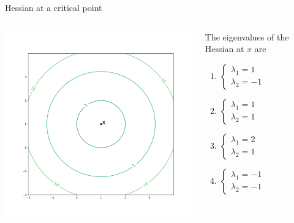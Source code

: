 \documentclass{beamer}
\begin{document}
\begin{frame}[t]{Hessian at a critical point}

	\vspace{-1.6cm}
	\begin{columns}
		\begin{column}{0.7\textwidth}
			\hspace*{-1.7cm}
			\includegraphics[width=11.0cm]{contour_min1.pdf}
		\end{column}
		\hspace*{0.2cm}
		\begin{column}{0.29\textwidth}
			The eigenvalues of the Hessian at $x$ are
			\begin{enumerate}
				\item $
					\begin{cases}
						\lambda_1 = 1 \\
						\lambda_2 = -1
					\end{cases}
					$
				\item $
					\begin{cases}
						\lambda_1 = 1 \\
						\lambda_2 = 1
					\end{cases}
					$
				\item $
					\begin{cases}
						\lambda_1 = 2 \\
						\lambda_2 = 1
					\end{cases}
					$
				\item $
					\begin{cases}
						\lambda_1 = -1 \\
						\lambda_2 = -1
					\end{cases}
					$
			\end{enumerate}
		\end{column}
	\end{columns}

\end{frame}
\end{document}
